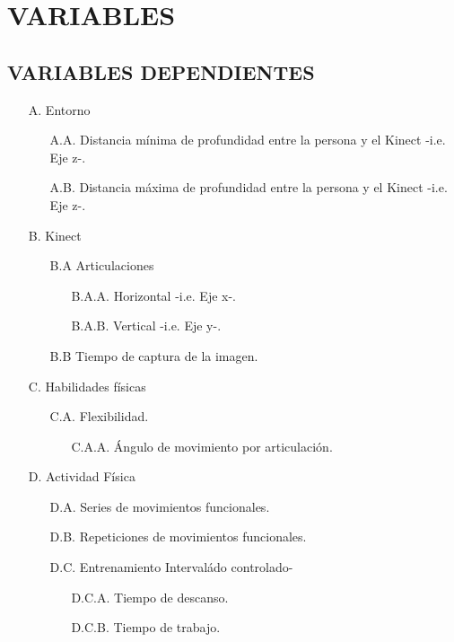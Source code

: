 \section{VARIABLES} \label{vr}
\subsection{VARIABLES DEPENDIENTES} \label{vr:d}
\begin{enumerate}
   \item[A.] Entorno
   \begin{enumerate}
       \item[A.A.] Distancia m\'inima de profundidad entre la persona y el Kinect -i.e. Eje z-.
       \item[A.B.] Distancia m\'axima de profundidad entre la persona y el Kinect -i.e. Eje z-.
   \end{enumerate}
   \item[B.] Kinect
   \begin{enumerate}
      \item[B.A] Articulaciones
       \begin{enumerate}
	       \item[B.A.A.] Horizontal -i.e. Eje x-.
       	   \item[B.A.B.] Vertical -i.e. Eje y-.
       \end{enumerate}
       \item[B.B] Tiempo de captura de la imagen.
   \end{enumerate}
   \item[C.] Habilidades f\'isicas
   \begin{enumerate}
   		\item[C.A.] Flexibilidad.
   		\begin{enumerate}
   			\item[C.A.A.] \'Angulo de movimiento por articulaci\'on.
   		\end{enumerate}
   \end{enumerate}  
   \item[D.] Actividad F\'isica
   \begin{enumerate}   		
   		\item[D.A.] Series de movimientos funcionales.
   	    \item[D.B.] Repeticiones de movimientos funcionales.
   	    \item[D.C.] Entrenamiento Interval\'ado  controlado-
   	    \begin{enumerate}
   	    	\item[D.C.A.] Tiempo de descanso.
   	    	\item[D.C.B.] Tiempo de trabajo.
   	    \end{enumerate}  
   \end{enumerate}  
\end{enumerate}
